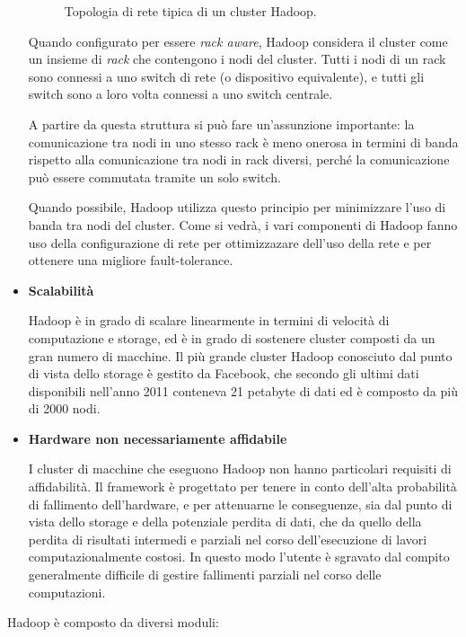 \documentclass[italian,a4paper, twoside, 12pt]{report}
\begin{document}
\begin{itemize}
  \begin{figure}
  \def\svgwidth{\linewidth}
  
  \label{fig:hadoop-topology}
  \caption{Topologia di rete tipica di un cluster Hadoop.}
  \end{figure}

  Quando configurato per essere \emph{rack aware}, Hadoop considera il
  cluster come un insieme di \emph{rack} che contengono i nodi del
  cluster. Tutti i nodi di un rack sono connessi a uno switch di rete (o
  dispositivo equivalente), e tutti gli switch sono a loro volta
  connessi a uno switch centrale.

  A partire da questa struttura si può fare un'assunzione importante: la
  comunicazione tra nodi in uno stesso rack è meno onerosa in termini di
  banda rispetto alla comunicazione tra nodi in rack diversi, perché la
  comunicazione può essere commutata tramite un solo switch.

  Quando possibile, Hadoop utilizza questo principio per minimizzare
  l'uso di banda tra nodi del cluster. Come si vedrà, i vari componenti
  di Hadoop fanno uso della configurazione di rete per ottimizzazare
  dell'uso della rete e per ottenere una migliore fault-tolerance.
\item
  \textbf{Scalabilità}

  Hadoop è in grado di scalare linearmente in termini di velocità di
  computazione e storage, ed è in grado di sostenere cluster composti da
  un gran numero di macchine. Il più grande cluster Hadoop conosciuto
  dal punto di vista dello storage è gestito da Facebook, che secondo
  gli ultimi dati disponibili nell'anno 2011 conteneva 21 petabyte di
  dati ed è composto da più di 2000 nodi.\textbar{}\textbar{}\textbar{}
\item
  \textbf{Hardware non necessariamente affidabile}

  I cluster di macchine che eseguono Hadoop non hanno particolari
  requisiti di affidabilità. Il framework è progettato per tenere in
  conto dell'alta probabilità di fallimento dell'hardware, e per
  attenuarne le conseguenze, sia dal punto di vista dello storage e
  della potenziale perdita di dati, che da quello della perdita di
  risultati intermedi e parziali nel corso dell'esecuzione di lavori
  computazionalmente costosi. In questo modo l'utente è sgravato dal
  compito generalmente difficile di gestire fallimenti parziali nel
  corso delle computazioni.
\end{itemize}

Hadoop è composto da diversi moduli:
\end{document}
